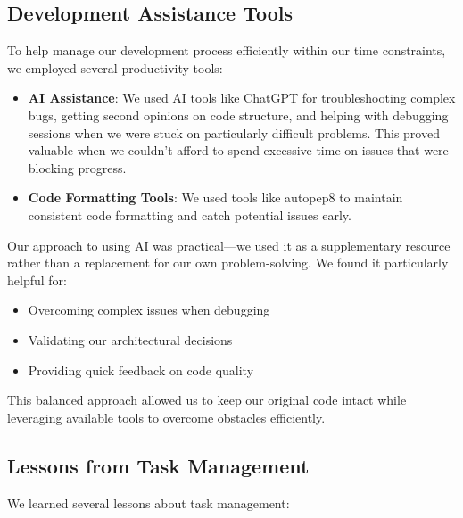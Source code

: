 \subsection{Development Assistance Tools}

To help manage our development process efficiently within our time constraints, we employed several productivity tools:

\begin{itemize}
    \item \textbf{AI Assistance}: We used AI tools like ChatGPT for troubleshooting complex bugs, getting second opinions on code structure, and helping with debugging sessions when we were stuck on particularly difficult problems. This proved valuable when we couldn't afford to spend excessive time on issues that were blocking progress.
    
    \item \textbf{Code Formatting Tools}: We used tools like autopep8 to maintain consistent code formatting and catch potential issues early.
    
\end{itemize}

Our approach to using AI was practical—we used it as a supplementary resource rather than a replacement for our own problem-solving. We found it particularly helpful for:

\begin{itemize}
    \item Overcoming complex issues when debugging 
    \item Validating our architectural decisions
    \item Providing quick feedback on code quality
\end{itemize}

This balanced approach allowed us to keep our original code intact while leveraging available tools to overcome obstacles efficiently.

\subsection{Lessons from Task Management}

We learned several lessons about task management:

